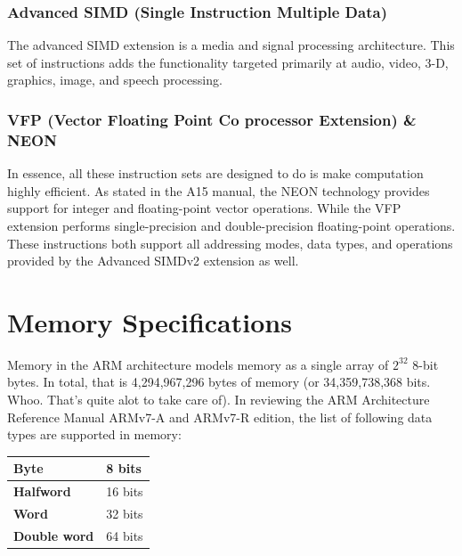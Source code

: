 \documentclass[12pt]{scrreprt}
\begin{document}
		\subsection{Advanced SIMD (Single Instruction Multiple Data)}
			The advanced SIMD extension is a media and signal processing architecture.
			This set of instructions adds the functionality targeted primarily at audio, video, 3-D, graphics, image, and speech processing.
		
		\subsection{VFP (Vector Floating Point Co processor Extension) \& NEON}
			In essence, all these instruction sets are designed to do is make computation highly efficient.
			As stated in the A15 manual, the NEON technology provides support for integer and floating-point vector operations.
			While the VFP extension performs single-precision and double-precision floating-point operations.
			These instructions both support all addressing modes, data types, and operations provided by the Advanced SIMDv2 extension as well.

{\let\clearpage\relax\chapter{Memory Specifications}}

	Memory in the ARM architecture models memory as a single array of $2^{32}$ 8-bit bytes.
	In total, that is 4,294,967,296 bytes of memory (or 34,359,738,368 bits. Whoo. That's quite alot to take care of). In reviewing the ARM Architecture Reference Manual ARMv7-A and ARMv7-R edition, the list of following data types are supported in memory:


	\begin{center}
		\begin{tabular}{|l|l|}
		\hline
			\bfseries Byte & 8 bits \\ \hline
			\bfseries Halfword & 16 bits \\ \hline
			\bfseries Word & 32 bits \\ \hline
			\bfseries Double word & 64 bits \\ \hline
		\end{tabular}
	\end{center}
\end{document}
